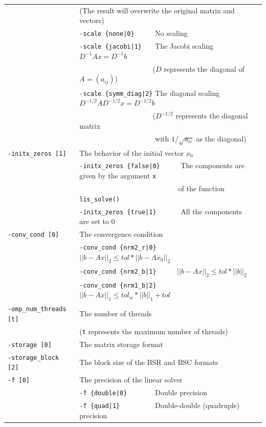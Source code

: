 \documentclass[a4paper]{article}
\begin{document}
\begin{minipage}[t]{\textwidth}
\begin{center}
\begin{tabular}{l|ll}
                       & (The result will overwrite the original matrix and vectors) \\
                       & \verb=-scale {none|0}     =  No scaling \\ 
                       & \verb=-scale {jacobi|1}   =  The Jacobi scaling $D^{-1}Ax=D^{-1}b$ \\
                       & \verb=                    =  ($D$ represents the diagonal of $A=(a_{ij})$)\\
                       & \verb=-scale {symm_diag|2}=  The diagonal scaling $D^{-1/2}AD^{-1/2}x=D^{-1/2}b$ \\
                       & \verb=                    =  ($D^{-1/2}$ represents the diagonal matrix \\
                       & \verb=                    =  with $1/\sqrt{a_{ii}}$ as the diagonal) \\ 
\verb=-initx_zeros [1]= & The behavior of the initial vector $x_{0}$  \\
                       & \verb=-initx_zeros {false|0}     =  The components are given by the argument \verb=x= \\
                       & \verb=                           =  of the function \verb=lis_solve()= \\
                       & \verb=-initx_zeros {true|1}      =  All the components are set to $0$ \\
\verb=-conv_cond [0]= & The convergence condition  \\
                       & \verb=-conv_cond {nrm2_r|0}     =  $||b-Ax||_2 \le tol * ||b-Ax_0||_2$ \\
                       & \verb=-conv_cond {nrm2_b|1}     =  $||b-Ax||_2 \le tol * ||b||_2$ \\
                       & \verb=-conv_cond {nrm1_b|2}     =  $||b-Ax||_1 \le tol_w * ||b||_1 + tol$\\
\verb=-omp_num_threads [t]= & The number of threads        \\ 
                            & (\verb=t= represents the maximum number of
 threads) \\
\verb=-storage [0]=    & The matrix storage format \\
\verb=-storage_block [2]=& The block size of the BSR and BSC formats\\ 
\verb=-f [0]=          & The precision of the linear solver\\
                       & \verb=-f {double|0}       =  Double precision \\ 
                       & \verb=-f {quad|1}         =  Double-double (quadruple) precision \\
\hline         
\end{tabular}
\end{center}
\end{minipage}
\end{document}
